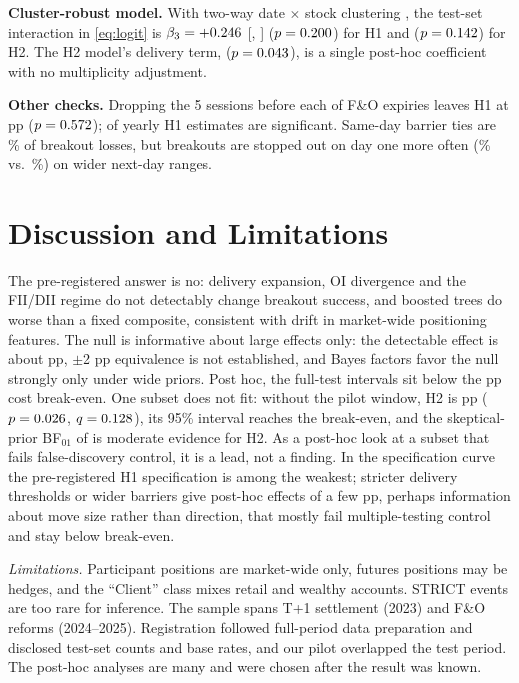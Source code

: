 \documentclass[conference]{IEEEtran}
\begin{document}
\textbf{Cluster-robust model.} With two-way date $\times$ stock clustering \cite{cameron2011}, the test-set
interaction in \eqref{eq:logit} is $\beta_3=+0.246$ [\EOneBThreeLo, \EOneBThreeHi] ($p=0.200$)
for H1 and \ETwoBThree{} ($p=0.142$) for H2. The H2 model's delivery term, \ETwoBTwo{}
($p=0.043$), is a single post-hoc coefficient with no multiplicity adjustment.

\textbf{Other checks.} Dropping the 5 sessions before each of \ExpN{} F\&O expiries leaves H1 at
\ExpDiff{} pp ($p=0.572$); \FYearsSig{} of \FYears{} yearly H1 estimates are significant. Same-day barrier
ties are \GTieShareLoss\% of breakout losses, but breakouts are stopped out on day one more often
(\GDayOneBO\% vs.\ \GDayOneNB\%) on wider next-day ranges.

\section{Discussion and Limitations}
The pre-registered answer is no: delivery expansion, OI divergence and the FII/DII regime do not detectably
change breakout success, and boosted trees do worse than a fixed composite, consistent with drift in
market-wide positioning features. The null is informative about large effects only: the detectable effect is
about \MDEHOne{} pp, $\pm$2 pp equivalence is not established, and Bayes factors favor the null strongly only
under wide priors. Post hoc, the full-test intervals sit below the \BreakEven{} pp cost break-even. One subset
does not fit: without the pilot window, H2 is \NPHTwoDiff{} pp ($p=0.026$, $q=0.128$), its 95\% interval
reaches the break-even, and the skeptical-prior BF$_{01}$ of \BFNPTwoSkep{} is moderate evidence for H2. As a
post-hoc look at a subset that fails false-discovery control, it is a lead, not a finding. In the
specification curve the pre-registered H1 specification is among the weakest; stricter delivery thresholds or
wider barriers give post-hoc effects of a few pp, perhaps information about move size rather than direction,
that mostly fail multiple-testing control and stay below break-even.

\emph{Limitations.} Participant positions are market-wide only, futures positions may be hedges, and the
``Client'' class mixes retail and wealthy accounts. STRICT events are too rare for inference. The sample spans
T+1 settlement (2023) and F\&O reforms (2024--2025). Registration followed full-period data preparation and
disclosed test-set counts and base rates, and our pilot overlapped the test period. The post-hoc analyses are
many and were chosen after the result was known.
\end{document}
